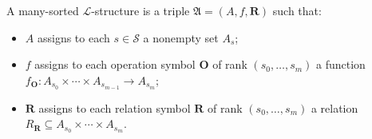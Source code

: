 A many-sorted $\mathcal{L}$-structure is a triple $\mathfrak{A} = (A, f, \mathbf{R})$ such that:
\begin{itemize}
\item[(i)] $A$ assigns to each $s \in \mathcal{S}$ a nonempty set $A_s$;
\item[(ii)] $f$ assigns to each operation symbol $\mathbf{O}$ of rank $(s_0, \ldots, s_m)$ a function $f_{\mathbf{O}} : A_{s_0} \times \cdots \times A_{s_{m-1}} \to A_{s_m}$;
\item[(iii)] $\mathbf{R}$ assigns to each relation symbol $\mathbf{R}$ of rank $(s_0, \ldots, s_m)$ a relation $R_{\mathbf{R}} \subseteq A_{s_0} \times \cdots \times A_{s_m}$.
\end{itemize}
